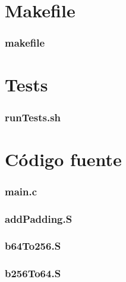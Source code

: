 \section{Makefile}\label{appendix_makefile}

\subsubsection{makefile}\label{app_makefile}

\clearpage

\section{Tests}\label{appendix_tests}

\subsubsection{runTests.sh}\label{app_run_tests}


\clearpage
\section{Código fuente}\label{appendix_codigo_fuente}

\subsubsection{main.c}\label{app_main}

\clearpage

\subsubsection{addPadding.S}\label{app_addPadding}

\clearpage

\subsubsection{b64To256.S}\label{app_b64To256}

\clearpage

\subsubsection{b256To64.S}\label{app_b256To64}

\clearpage

